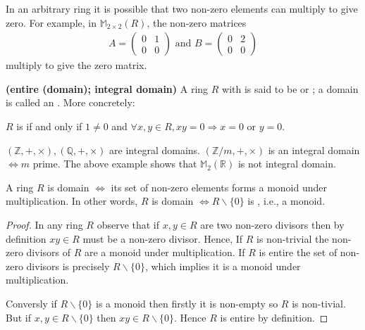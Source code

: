 \documentclass{article}
\newcommand{\bfs}[1]{\textbf{({#1}) }}
\begin{document}
\begin{exma}
  In an arbitrary ring it is possible that two non-zero elements can multiply to give zero. For example, in $\mathbb{M}_{2 \times 2}(R)$, the non-zero matrices
\begin{align*}
A=\left(\begin{array}{ll}
0 & 1 \\
0 & 0
\end{array}\right) \text { and } B=\left(\begin{array}{ll}
0 & 2 \\
0 & 0
\end{array}\right)
\end{align*}
multiply to give the zero matrix.
\end{exma}
  \begin{defa}\bfs{entire (domain); integral domain}
   A  ring $R$ with  is said to be  or ; a  domain is called an . More concretely: 
   
   \centerline{$R$ is  if and only if $1 \neq 0$ and $\forall x, y \in R, x y=0 \Rightarrow x=0$ or $y=0$.}
\end{defa}
\begin{exma}
$(\mathbb{Z},+, \times),(\mathbb{Q},+, \times)$ are integral domains. $(\mathbb{Z} / m,+, \times)$ is an integral domain $\Longleftrightarrow m$ prime. The above example shows that $\mathbb{M}_{2}(\mathbb{R})$ is not integral domain.
\end{exma}

\begin{thma}
 A ring $R$ is domain $\Longleftrightarrow$ its set of non-zero elements forms a monoid under multiplication. In other words,  $R$ is domain $\Longleftrightarrow R \backslash\{0\}$ is , i.e., a monoid.
\end{thma}
\begin{proof}
In any ring $R$ observe that if $x, y \in R$ are two non-zero divisors then by definition $x y \in R$ must be a non-zero divisor. Hence, If $R$ is non-trivial the non-zero divisors of $R$ are a monoid under multiplication. If $R$ is entire the set of non-zero divisors is precisely $R \backslash\{0\}$, which implies it is a monoid under multiplication.

Conversly if $R \backslash\{0\}$ is a monoid then firstly it is non-empty so $R$ is non-tivial. But if $x, y \in R \backslash\{0\}$ then $x y \in R \backslash\{0\}$. Hence $R$ is entire by definition.
\end{proof}
\end{document}
